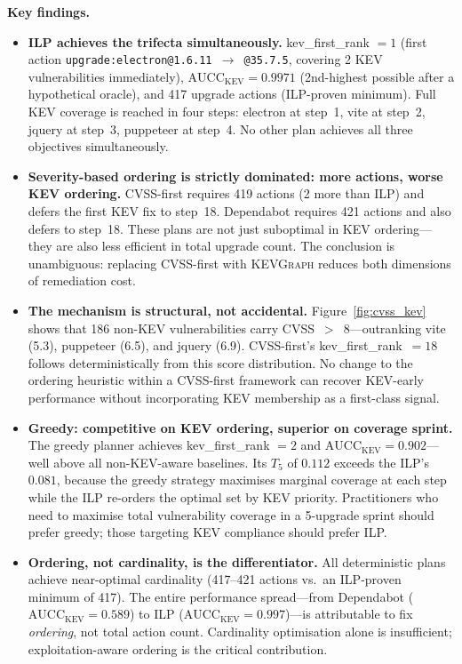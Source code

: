 \documentclass[conference]{IEEEtran}
\newcommand{\kevgraph}{\textsc{KEVGraph}\xspace}
\newcommand{\aucc}{$\mathrm{AUCC}_{\mathrm{KEV}}$\xspace}
\newcommand{\Tfive}{$T_5$\xspace}
\begin{document}
\textbf{Key findings.}

\begin{itemize}
  \item \textbf{ILP achieves the trifecta simultaneously.}
        kev\_first\_rank $= 1$ (first action
        \texttt{upgrade:electron@1.6.11\,$\to$\,@35.7.5}, covering 2 KEV
        vulnerabilities immediately), \aucc $= 0.9971$ (2nd-highest
        possible after a hypothetical oracle), and 417 upgrade actions
        (ILP-proven minimum).
        Full KEV coverage is reached in four steps: electron at step~1,
        vite at step~2, jquery at step~3, puppeteer at step~4.
        No other plan achieves all three objectives simultaneously.

  \item \textbf{Severity-based ordering is strictly dominated: more
        actions, worse KEV ordering.}
        CVSS-first requires 419 actions (2 more than ILP) and defers
        the first KEV fix to step~18.  Dependabot requires 421 actions
        and also defers to step~18.  These plans are not just suboptimal
        in KEV ordering---they are also less efficient in total upgrade
        count.  The conclusion is unambiguous: replacing CVSS-first with
        \kevgraph reduces both dimensions of remediation cost.

  \item \textbf{The mechanism is structural, not accidental.}
        Figure~\ref{fig:cvss_kev} shows that 186 non-KEV vulnerabilities
        carry CVSS~$>$~8---outranking vite (5.3), puppeteer (6.5), and
        jquery (6.9).  CVSS-first's kev\_first\_rank~$= 18$ follows
        deterministically from this score distribution.  No change to
        the ordering heuristic within a CVSS-first framework can
        recover KEV-early performance without incorporating KEV
        membership as a first-class signal.

  \item \textbf{Greedy: competitive on KEV ordering, superior on
        coverage sprint.}
        The greedy planner achieves kev\_first\_rank $= 2$ and
        \aucc $= 0.902$---well above all non-KEV-aware baselines.
        Its \Tfive of $0.112$ exceeds the ILP's $0.081$, because the
        greedy strategy maximises marginal coverage at each step while
        the ILP re-orders the optimal set by KEV priority.  Practitioners
        who need to maximise total vulnerability coverage in a 5-upgrade
        sprint should prefer greedy; those targeting KEV compliance
        should prefer ILP.

  \item \textbf{Ordering, not cardinality, is the differentiator.}
        All deterministic plans achieve near-optimal cardinality
        (417--421 actions vs.\ an ILP-proven minimum of 417).  The
        entire performance spread---from Dependabot (\aucc $= 0.589$) to
        ILP (\aucc $= 0.997$)---is attributable to fix \emph{ordering},
        not total action count.  Cardinality optimisation alone is
        insufficient; exploitation-aware ordering is the critical
        contribution.
\end{itemize}
\end{document}
